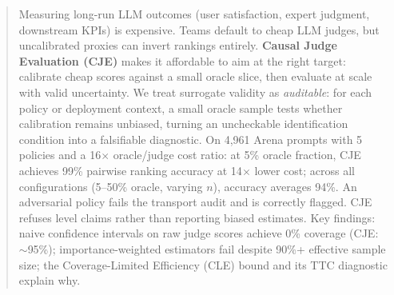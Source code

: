 \begin{abstract}
Measuring long-run LLM outcomes (user satisfaction, expert judgment, downstream KPIs) is expensive. Teams default to cheap LLM judges, but uncalibrated proxies can invert rankings entirely. \textbf{Causal Judge Evaluation (CJE)} makes it affordable to aim at the right target: calibrate cheap scores against a small oracle slice, then evaluate at scale with valid uncertainty.
We treat surrogate validity as \emph{auditable}: for each policy or deployment context, a small oracle sample tests whether calibration remains unbiased, turning an uncheckable identification condition into a falsifiable diagnostic.
On 4,961 Arena prompts with 5 policies and a 16$\times$ oracle/judge cost ratio: at 5\% oracle fraction, CJE achieves 99\% pairwise ranking accuracy at 14$\times$ lower cost; across all configurations (5--50\% oracle, varying $n$), accuracy averages 94\%. An adversarial policy fails the transport audit and is correctly flagged. CJE refuses level claims rather than reporting biased estimates.
Key findings: naive confidence intervals on raw judge scores achieve 0\% coverage (CJE: ${\sim}$95\%); importance-weighted estimators fail despite 90\%+ effective sample size; the Coverage-Limited Efficiency (CLE) bound and its TTC diagnostic explain why.
\end{abstract}
